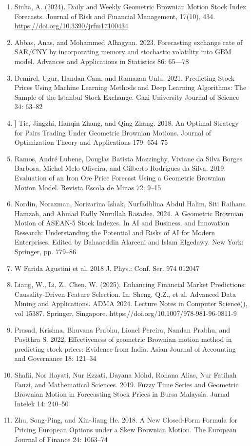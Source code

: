 \begin{talk}
\begin{enumerate}
    \item[{[1]}] Sinha, A. (2024). Daily and Weekly Geometric Brownian Motion Stock Index Forecasts. Journal of Risk and Financial Management, 17(10), 434. \\ \href{https://doi.org/10.3390/jrfm17100434}{https://doi.org/10.3390/jrfm17100434}
    \item[{[2]}] Abbas, Anas, and Mohammed Alhagyan. 2023. Forecasting exchange rate of SAR/CNY by incorporating memory and stochastic volatility into GBM model. Advances and Applications in Statistics 86: 65---78
    \item[{[3]}] Demirel, Ugur, Handan Cam, and Ramazan Unlu. 2021. Predicting Stock Prices Using Machine Learning Methods and Deep Learning Algorithms: The Sample of the Istanbul Stock Exchange. Gazi University Journal of Science 34: 63--82
    \item[{[4]}]] Tie, Jingzhi, Hanqin Zhang, and Qing Zhang. 2018. An Optimal Strategy for Pairs Trading Under Geometric Brownian Motions. Journal of Optimization Theory and Applications 179: 654--75
    \item[{[5]}] Ramos, Andr\'e Lubene, Douglas Batista Mazzinghy, Viviane da Silva Borges Barbosa, Michel Melo Oliveira, and Gilberto Rodrigues da Silva. 2019. Evaluation of an Iron Ore Price Forecast Using a Geometric Brownian Motion Model. Revista Escola de Minas 72: 9--15
    \item[{[6]}] Nordin, Norazman, Norizarina Ishak, Nurfadhlina Abdul Halim, Siti Raihana Hamzah, and Ahmad Fadly Nurullah Rasadee. 2024. A Geometric Brownian Motion of ASEAN-5 Stock Indexes. In AI and Business, and Innovation Research: Understanding the Potential and Risks of AI for Modern Enterprises. Edited by Bahaaeddin Alareeni and Islam Elgedawy. New York: Springer, pp. 779--86
    \item[{[7]}] W Farida Agustini et al. 2018 J. Phys.: Conf. Ser. 974 012047
    \item[{[8]}] Liang, W., Li, Z., Chen, W. (2025). Enhancing Financial Market Predictions: Causality-Driven Feature Selection. In: Sheng, Q.Z., et al. Advanced Data Mining and Applications. ADMA 2024. Lecture Notes in Computer Science(), vol 15387. Springer, Singapore. https://doi.org/10.1007/978-981-96-0811-9
    \item[{[9]}] Prasad, Krishna, Bhuvana Prabhu, Lionel Pereira, Nandan Prabhu, and Pavithra S. 2022. Effectiveness of geometric Brownian motion method in predicting stock prices: Evidence from India. Asian Journal of Accounting and Governance 18: 121--34
    \item[{[10]}] Shafii, Nor Hayati, Nur Ezzati, Dayana Mohd, Rohana Alias, Nur Fatihah Fauzi, and Mathematical Sciences. 2019. Fuzzy Time Series and Geometric Brownian Motion in Forecasting Stock Prices in Bursa Malaysia. Jurnal Intelek 14: 240--50
    \item[{[11]}] Zhu, Song-Ping, and Xin-Jiang He. 2018. A New Closed-Form Formula for Pricing European Options under a Skew Brownian Motion. The European Journal of Finance 24: 1063--74
\end{enumerate}


\end{talk}
